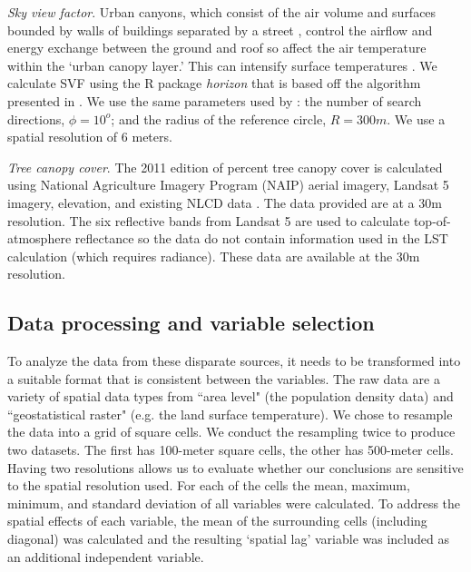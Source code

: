 \documentclass[final,3p,times,onecolumn,sort&compress]{elsarticle}
\begin{document}
\textit{Sky view factor}. 
Urban canyons, which consist of the air volume and surfaces bounded by walls of buildings separated by a street \citep{Oke2017-or}, control the airflow and energy exchange between the ground and roof \citep{Oke1976-zn} so affect the air temperature within the `urban canopy layer.'
This can intensify surface temperatures \citep{Landsberg1981-mq, Chun2017-mm, Matzarakis2007-xy}. 
We calculate SVF using the R package \textit{horizon} \citep{Van_doninck2018-ib} that is based off the algorithm presented in \citep{Dozier1990-kn}. 
We use the same parameters used by \citep{Chun2017-mm}: the number of search directions, $\phi=10^o$; and the radius of the reference circle, $R=300m$. 
We use a spatial resolution of 6 meters.

\textit{Tree canopy cover}. 
The 2011 edition of percent tree canopy cover is calculated using National Agriculture Imagery Program (NAIP) aerial imagery, Landsat 5 imagery, elevation, and existing NLCD data \citep{Coulston2012-uu, Homer2015-ce}. 
The data provided are at a 30m resolution. 
The six reflective bands from Landsat 5 are used to calculate top-of-atmosphere reflectance \citep{Coulston2012-uu} so the data do not contain information used in the LST calculation (which requires radiance). 
These data are available at the 30m resolution.

\subsection{Data processing and variable selection}
To analyze the data from these disparate sources, it needs to be transformed into a suitable format that is consistent between the variables.
The raw data are a variety of spatial data types from ``area level" (the population density data) and ``geostatistical raster" (e.g. the land surface temperature).
We chose to resample the data into a grid of square cells.
We conduct the resampling twice to produce two datasets. The first has 100-meter square cells, the other has 500-meter cells. 
Having two resolutions allows us to evaluate whether our conclusions are sensitive to the spatial resolution used.
For each of the cells the mean, maximum, minimum, and standard deviation of all variables were calculated. 
To address the spatial effects of each variable, the mean of the surrounding cells (including diagonal) was calculated and the resulting `spatial lag' variable was included as an additional independent variable. 
\end{document}
